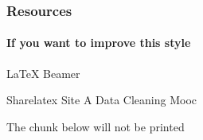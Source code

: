 \documentclass[12pt]{beamer}\usepackage[]{graphicx}\usepackage[]{color}
\begin{document}
\begin{frame}
  \frametitle{Resources}
  \framesubtitle{If you want to improve this style}
  \begin{thebibliography}{10}

  \beamertemplatearticlebibitems
    LaTeX Beamer

  \bibitem{}
    Sharelatex Site %
  \bibitem{}
    A Data Cleaning Mooc %
  \end{thebibliography}
\end{frame}

%
%



%
%









The chunk below will not be printed








\end{document}

